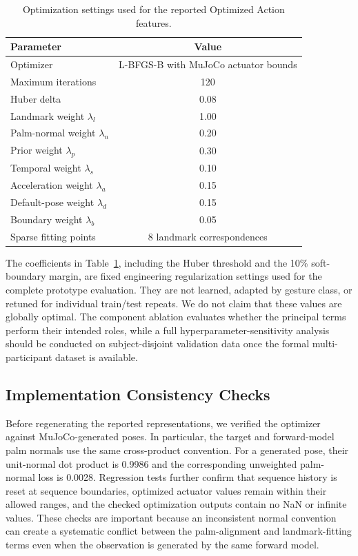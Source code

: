 \documentclass[11pt]{article}
\begin{document}
\begin{table}[t]
\centering
\caption{Optimization settings used for the reported Optimized Action features.}
\label{tab:optimization_details}
\footnotesize
\begin{tabular}{@{}lc@{}}
\toprule
Parameter & Value \\
\midrule
Optimizer & L-BFGS-B with MuJoCo actuator bounds \\
Maximum iterations & 120 \\
Huber delta & 0.08 \\
Landmark weight $\lambda_l$ & 1.00 \\
Palm-normal weight $\lambda_n$ & 0.20 \\
Prior weight $\lambda_p$ & 0.30 \\
Temporal weight $\lambda_s$ & 0.10 \\
Acceleration weight $\lambda_a$ & 0.15 \\
Default-pose weight $\lambda_d$ & 0.15 \\
Boundary weight $\lambda_b$ & 0.05 \\
Sparse fitting points & 8 landmark correspondences \\
\bottomrule
\end{tabular}
\end{table}

The coefficients in Table~\ref{tab:optimization_details}, including the Huber threshold and the 10\% soft-boundary margin, are fixed engineering regularization settings used for the complete prototype evaluation. They are not learned, adapted by gesture class, or retuned for individual train/test repeats. We do not claim that these values are globally optimal. The component ablation evaluates whether the principal terms perform their intended roles, while a full hyperparameter-sensitivity analysis should be conducted on subject-disjoint validation data once the formal multi-participant dataset is available.

\subsection{Implementation Consistency Checks}
Before regenerating the reported representations, we verified the optimizer against MuJoCo-generated poses. In particular, the target and forward-model palm normals use the same cross-product convention. For a generated pose, their unit-normal dot product is 0.9986 and the corresponding unweighted palm-normal loss is 0.0028. Regression tests further confirm that sequence history is reset at sequence boundaries, optimized actuator values remain within their allowed ranges, and the checked optimization outputs contain no NaN or infinite values. These checks are important because an inconsistent normal convention can create a systematic conflict between the palm-alignment and landmark-fitting terms even when the observation is generated by the same forward model.
\end{document}
